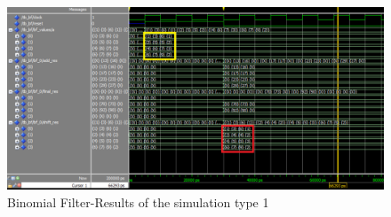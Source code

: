      
     \begin{figure}[h!]
     	\centering	
     	\includegraphics[width=\textwidth]{imm/bf/tb_bf.png}  
     	\caption{Binomial Filter-Results of the simulation type 1} 
     	\label{fig:tb_bf}
     \end{figure}
     
